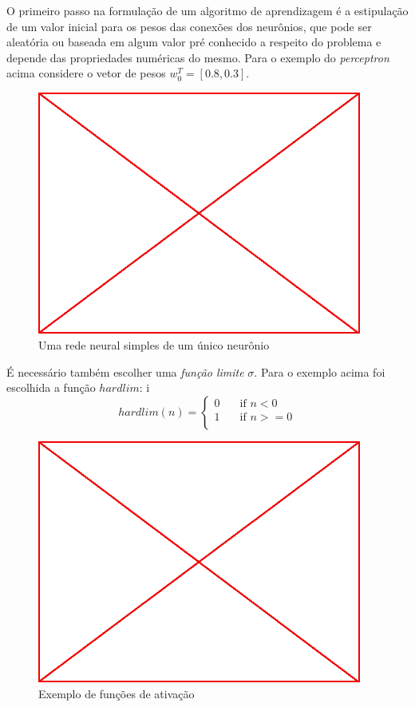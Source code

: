 O primeiro passo na formulação de um algoritmo de aprendizagem é a estipulação
de um valor inicial para os pesos das conexões dos neurônios, que pode ser
aleatória ou baseada em algum valor pré conhecido a respeito do problema e
depende das propriedades numéricas do mesmo. Para o exemplo do
\emph{perceptron} acima considere o vetor de pesos $w_0^T=[0.8,0.3]$.

\begin{figure}\label{fig:simple-perceptron}
  \caption{Uma rede neural simples de um único neurônio}
  \begin{center}
    \includegraphics[height=8cm]{placeholder}
  \end{center}
\end{figure}

É necessário também escolher uma \emph{função limite} $\sigma$. Para o exemplo
acima foi escolhida a função $hardlim$:
i
$$
hardlim(n) = \begin{cases}
  0 & \quad \text{if~} n<0\\
  1 & \quad \text{if~} n>=0\\
  \end{cases}
$$



\begin{figure}\label{fig:limit-functions-exapmple}
  \caption{Exemplo de funções de ativação}
  \begin{center}
    \includegraphics[height=8cm]{placeholder}
  \end{center}
\end{figure}

